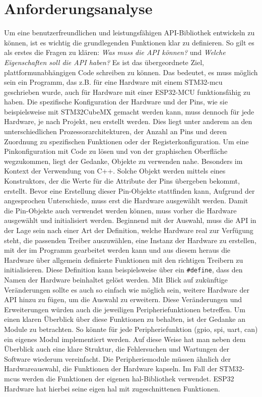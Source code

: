 \section{Anforderungsanalyse}
Um eine benutzerfreundlichen und leistungsfähigen API-Bibliothek entwickeln zu können, ist es wichtig die grundlegenden Funktionen klar zu definieren.
So gilt es als erstes die Fragen zu klären: \emph{Was muss die API können?} und \emph{Welche Eigenschaften soll die API haben?}
Es ist das übergeordnete Ziel, plattformunabhängigen Code schreiben zu können.
Das bedeutet, es muss möglich sein ein Programm, das z.B. für eine Hardware mit einem STM32-\gls{mcu} geschrieben wurde, auch für Hardware mit einer ESP32-MCU funktionsfähig zu haben.
Die spezifische Konfiguration der Hardware und der Pins, wie sie beispielsweise mit STM32CubeMX gemacht werden kann, muss dennoch für jede Hardware, je nach Projekt, neu erstellt werden.
Dies liegt unter anderem an den unterschiedlichen Prozessorarchitekturen, der Anzahl an Pins und deren Zuordnung zu spezifischen Funktionen oder der Registerkonfiguration.
Um eine Pinkonfiguration mit Code zu lösen und von der graphischen Oberfläche wegzukommen, liegt der Gedanke, Objekte zu verwenden nahe.
Besonders im Kontext der Verwendung von C++.
Solche Objekt werden mittels eines Konstruktors, der die Werte für die Attribute der Pins übergeben bekommt, erstellt.
Bevor eine Erstellung dieser Pin-Objekte stattfinden kann, Aufgrund der angesprochen Unterschiede, muss erst die Hardware ausgewählt werden.
Damit die Pin-Objekte auch verwendet werden können, muss vorher die Hardware ausgewählt und initialisiert werden.
Beginnend mit der Auswahl, muss die API in der Lage sein nach einer Art der Definition, welche Hardware real zur Verfügung steht, die passenden Treiber auszuwählen, eine Instanz der Hardware zu erstellen, mit der im Programm gearbeitet werden kann und aus diesem heraus die Hardware über allgemein definierte Funktionen mit den richtigen Treibern zu initialisieren.
Diese Definition kann beispielsweise über ein \texttt{\#define}, dass den Namen der Hardware beinhaltet gelöst werden.
Mit Blick auf zukünftige Veränderungen sollte es auch so einfach wie möglich sein, weitere Hardware der API hinzu zu fügen, um die Auswahl zu erweitern.
Diese Veränderungen und Erweiterungen würden auch die jeweiligen Peripheriefunktionen betreffen.
Um einen klaren Überblick über diese Funktionen zu behalten, ist der Gedanke an Module zu betrachten.
So könnte für jede Peripheriefunktion (\gls{gpio}, \gls{spi}, \gls{uart}, \gls{can}) ein eigenes Modul implementiert werden.
Auf diese Weise hat man neben dem Überblick auch eine klare Struktur, die Fehlersuchen und Wartungen der Software wiederum vereinfacht.
Die Peripheriemodule müssen ähnlich der Hardwareauswahl, die Funktionen der Hardware kapseln.
Im Fall der STM32-\gls{mcu}s werden die Funktionen der eigenen \gls{hal}-Bibliothek verwendet.
ESP32 Hardware hat hierbei seine eigen \gls{hal} mit zugeschnittenen Funktionen.


